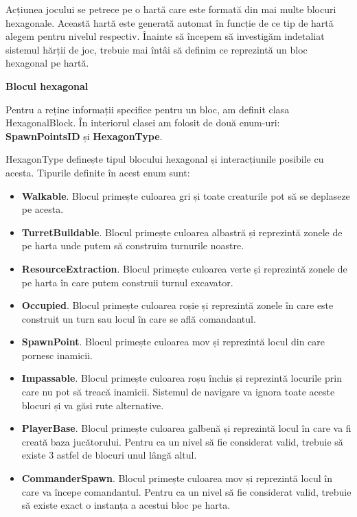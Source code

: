 \documentclass[12pt, a4paper]{article}
\begin{document}
	Acțiunea jocului se petrece pe o hartă care este formată din mai multe blocuri hexagonale. Această hartă este generată automat în funcție de ce tip de hartă alegem pentru nivelul respectiv. Înainte să începem să investigăm indetaliat sistemul hărții de joc, trebuie mai întâi să definim ce reprezintă un bloc hexagonal pe hartă.
	\newline
	
	
	
	
	
	\textbf{Blocul hexagonal}
	
	Pentru a reține informații specifice pentru un bloc, am definit clasa HexagonalBlock. În interiorul clasei am folosit de două enum-uri: \textbf{SpawnPointsID} și \textbf{HexagonType}.
	\newline
	
	HexagonType definește tipul blocului hexagonal și interacțiunile posibile cu acesta. Tipurile definite în acest enum sunt:
	
	\begin{itemize}
		\item \textbf{Walkable}. Blocul primește culoarea gri și toate creaturile pot să se deplaseze pe acesta.
		\item \textbf{TurretBuildable}. Blocul primește culoarea albastră și reprezintă zonele de pe harta unde putem să construim turnurile noastre.
		\item \textbf{ResourceExtraction}. Blocul primește culoarea verte și reprezintă zonele de pe harta în care putem construii turnul excavator.
		\item \textbf{Occupied}. Blocul primește culoarea roșie și reprezintă zonele în care este construit un turn sau locul în care se află comandantul.
		\item \textbf{SpawnPoint}. Blocul primește culoarea mov și reprezintă locul din care pornesc inamicii.
		\item \textbf{Impassable}. Blocul primește culoarea roșu închis și reprezintă locurile prin care nu pot să treacă inamicii. Sistemul de navigare va ignora toate aceste blocuri și va găsi rute alternative.
		\item \textbf{PlayerBase}. Blocul primește culoarea galbenă și reprezintă locul în care va fi creată baza jucătorului. Pentru ca un nivel să fie considerat valid, trebuie să existe 3 astfel de blocuri unul lângă altul.
		\item \textbf{CommanderSpawn}. Blocul primește culoarea mov și reprezintă locul în care va începe comandantul. Pentru ca un nivel să fie considerat valid, trebuie să existe exact o instanța a acestui bloc pe harta.
	\end{itemize}
	
\end{document}
